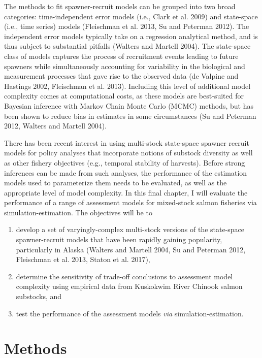 \documentclass[12pt,]{book}
\theoremstyle{definition}
\theoremstyle{definition}
\theoremstyle{definition}
\theoremstyle{remark}
\begin{document}
The methods to fit spawner-recruit models can be grouped into two broad
categories: time-independent error models (i.e., Clark et al. 2009) and
state-space (i.e., time series) models (Fleischman et al. 2013, Su and
Peterman 2012). The independent error models typically take on a
regression analytical method, and is thus subject to substantial
pitfalls (Walters and Martell 2004). The state-space class of models
captures the process of recruitment events leading to future spawners
while simultaneously accounting for variability in the biological and
measurement processes that gave rise to the observed data (de Valpine
and Hastings 2002, Fleischman et al. 2013). Including this level of
additional model complexity comes at computational costs, as these
models are best-suited for Bayesian inference with Markov Chain Monte
Carlo (MCMC) methods, but has been shown to reduce bias in estimates in
some circumstances (Su and Peterman 2012, Walters and Martell 2004).

There has been recent interest in using multi-stock state-space spawner
recruit models for policy analyses that incorporate notions of substock
diversity as well as other fishery objectives (e.g., temporal stability
of harvests). Before strong inferences can be made from such analyses,
the performance of the estimation models used to parameterize them needs
to be evaluated, as well as the appropriate level of model complexity.
In this final chapter, I will evaluate the performance of a range of
assessment models for mixed-stock salmon fisheries via
simulation-estimation. The objectives will be to

\begin{enumerate}
\def\labelenumi{(\arabic{enumi})}
\item
  develop a set of varyingly-complex multi-stock versions of the
  state-space spawner-recruit models that have been rapidly gaining
  popularity, particularly in Alaska (Walters and Martell 2004, Su and
  Peterman 2012, Fleischman et al. 2013, Staton et al. 2017),
\item
  determine the sensitivity of trade-off conclusions to assessment model
  complexity using empirical data from Kuskokwim River Chinook salmon
  substocks, and
\item
  test the performance of the assessment models \emph{via}
  simulation-estimation.
\end{enumerate}

\section{Methods}\label{methods-2}
\end{document}
